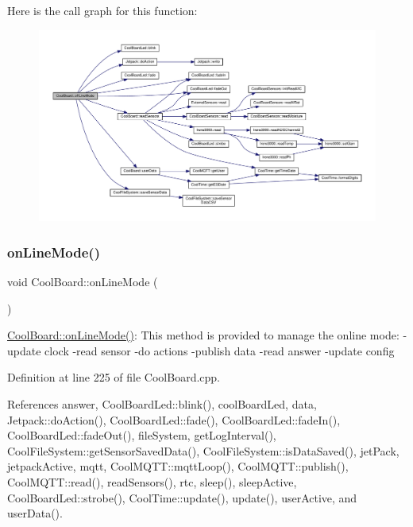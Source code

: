 Here is the call graph for this function\+:
\nopagebreak
\begin{figure}[H]
\begin{center}
\leavevmode
\includegraphics[width=350pt]{classCoolBoard_ae6b5e1274d760462290192acea4adca8_cgraph}
\end{center}
\end{figure}
\mbox{\label{classCoolBoard_aa0bbc4bc605e35618d18e68795c61363}} 
\subsubsection{\texorpdfstring{on\+Line\+Mode()}{onLineMode()}}
{\footnotesize\ttfamily void Cool\+Board\+::on\+Line\+Mode (\begin{DoxyParamCaption}{ }\end{DoxyParamCaption})}

\hyperlink{classCoolBoard_aa0bbc4bc605e35618d18e68795c61363}{Cool\+Board\+::on\+Line\+Mode()}\+: This method is provided to manage the online mode\+: -\/update clock -\/read sensor -\/do actions -\/publish data -\/read answer -\/update config 

Definition at line 225 of file Cool\+Board.\+cpp.



References answer, Cool\+Board\+Led\+::blink(), cool\+Board\+Led, data, Jetpack\+::do\+Action(), Cool\+Board\+Led\+::fade(), Cool\+Board\+Led\+::fade\+In(), Cool\+Board\+Led\+::fade\+Out(), file\+System, get\+Log\+Interval(), Cool\+File\+System\+::get\+Sensor\+Saved\+Data(), Cool\+File\+System\+::is\+Data\+Saved(), jet\+Pack, jetpack\+Active, mqtt, Cool\+M\+Q\+T\+T\+::mqtt\+Loop(), Cool\+M\+Q\+T\+T\+::publish(), Cool\+M\+Q\+T\+T\+::read(), read\+Sensors(), rtc, sleep(), sleep\+Active, Cool\+Board\+Led\+::strobe(), Cool\+Time\+::update(), update(), user\+Active, and user\+Data().


